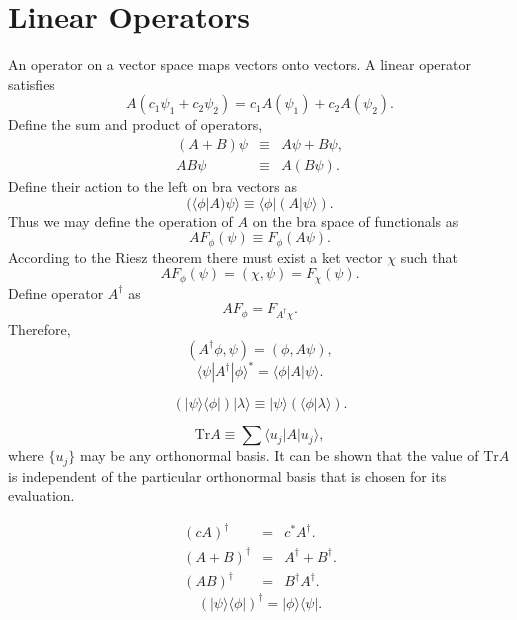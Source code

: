 \section{Linear Operators}
\begin{newdef}
An operator on a vector space maps vectors onto vectors.
A linear operator satisfies
\[A (c_1 \psi_1 + c_2 \psi_2) = c_1 A(\psi_1) + c_2 A(\psi_2).\]
Define the sum and product of operators,
\begin{eqnarray}
(A+B)\psi &\equiv & A\psi + B\psi, \nonumber \\
A B \psi &\equiv & A (B\psi). \nonumber
\end{eqnarray}
Define their action to the left on bra vectors as
\[(\langle \phi | A ) \psi \rangle \equiv \langle \phi | ( A | \psi \rangle ).\]
Thus we may define the operation of $A$ on the bra space of functionals as
\[A F_{\phi} (\psi) \equiv F_{\phi}(A\psi).\]
According to the Riesz theorem there must exist a ket vector $\chi$ such that
\[AF_{\phi}(\psi) = (\chi, \psi) = F_{\chi}(\psi).\]
Define operator $A^{\dagger}$ as
\[AF_{\phi} = F_{A^{\dagger}\chi}.\]
Therefore,
\[(A^{\dagger}\phi, \psi) = (\phi, A\psi),\]
\[\langle \psi | A^{\dagger} | \phi \rangle ^* = \langle \phi | A | \psi \rangle.\]
\end{newdef}

\begin{newdef}
\[(| \psi \rangle \langle \phi |) | \lambda \rangle \equiv | \psi \rangle (\langle \phi | \lambda \rangle).\]
\end{newdef}

\begin{newdef}[Trace]
\[ \mathrm{Tr} A \equiv \sum \langle u_j | A | u_j \rangle ,\]
where $\{ u_j \}$ may be any orthonormal basis. It can be shown that the value of $\mathrm{Tr}A$ is independent of the particular orthonormal basis that is chosen for its evaluation.
\end{newdef}

\begin{newprop}
\begin{eqnarray}
(cA)^{\dagger} &=& c^* A^{\dagger} .\nonumber \\
(A + B)^{\dagger} &=& A^{\dagger} + B^{\dagger} .\nonumber \\
(AB)^{\dagger} &=& B^{\dagger}  A^{\dagger} .\nonumber
\end{eqnarray}
\[(| \psi \rangle \langle \phi |) ^ {\dagger} = | \phi \rangle \langle \psi |.\]
\end{newprop}

